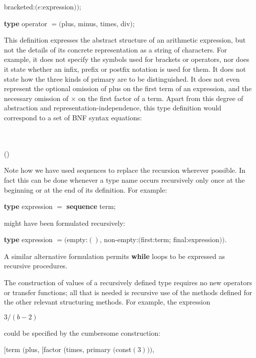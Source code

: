 \tabto*{9.3em}bracketed:$(e$:expression$))$;

\quad \textbf{type} operator $= ($plus, minus, times, div$)$;

This definition expresses the abstract structure of an arithmetic expression, but not the details of its concrete representation as a string of characters. For example, it does not specify the symbols used for brackets or operators, nor does it state whether an infix, prefix or postfix notation is used for them. It does not state how the three kinds of primary are to be distinguished. It does not even represent the optional omission of plus on the first term of an expression, and the necessary omission of $\times$ on the first factor of a term. Apart from this degree of abstraction and representation-independence, this type definition would correspond to a set of BNF syntax equations:
\begin{bnf*}
	{ \bnfor {} \bnfor {}}\\
	{ \bnfor {}\\
	{ \bnfor {} \bnfor ()}}
\end{bnf*}

Note how we have used sequences to replace the recursion wherever possible. In fact this can be done whenever a type name occurs recursively only once at the beginning or at the end of its definition. For example:

\quad \textbf{type} expression $=$ \textbf{sequence} term;

\noindent
might have been formulated recursively:

\quad \textbf{type} expression $= ($empty:$()$, non-empty:$($first:term; final:expression$))$.

\noindent
A similar alternative formulation permits \textbf{while} loops to be expressed as recursive procedures.

The construction of values of a recursively defined type requires no new operators or transfer functions; all that is needed is recursive use of the methods defined for the other relevant structuring methods. For example, the expression

\quad $3/(b - 2)$

\noindent
could be specified by the cumbersome construction:

\quad $[$term $($plus, $[$factor (times, primary $($const$(3)))$,

